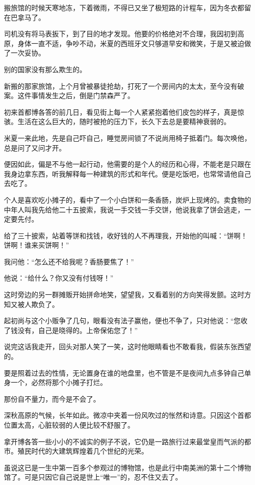 \par 搬旅馆的时候天寒地冻，下着微雨，不得已又坐了极短路的计程车，因为冬衣都留在巴拿马了。
\par 司机没有将马表扳下，到了目的地才发现。他要的价格绝对不合理，我因初到高原，身体一直不适，争吵不动，米夏的西班牙文只够道早安和微笑，于是又被迫做了一次妥协。
\par 别的国家没有那么欺生的。
\par 新搬的那家旅馆，上个月曾被暴徒抢劫，打死了一个房间内的太太，至今没有破案。这件事情发生之后，倒是门禁森严了。
\par 初来首都博各答的前几日，看见街上每一个人紧紧抱着他们皮包的样子，真是惊骇。生活在这么巨大的，随时被抢的压力下，长久下去总是要精神衰弱的。
\par 米夏一来此地，先是自己吓自己，睡觉房间锁了不说尚用椅子抵着门。每次唤他，总是问了又问才开。
\par 便因如此，偏是不与他一起行动，他需要的是个人的经历和心得，不能老是只跟在我身边拿东西，听我解释每一种建筑的形式和年代。便是吃饭吧，也常常请他自己去吃了。
\par 个人是喜欢吃小摊子的，看中了一个小白饼和一条香肠，炭炉上现烤的。卖食物的中年人叫我先给他二十五披索，我说一手交钱一手交饼，他说我拿了饼会逃走，一定要先付。
\par 给了三十披索，站着等饼和找钱，收好钱的人不再理我，开始他的叫喊：“饼啊！饼啊！谁来买饼啊！”
\par 我问他：“怎么还不给我呢？香肠要焦了！”
\par 他说：“给什么？你又没有付钱呀！”
\par 这时旁边的另一群摊贩开始拼命地笑，望望我，又看着别的方向笑得发颤。这时方知又被人欺负了。
\par 起初尚与这个小贩争了几句，眼看没有法子赢他，便也不争了，只对他说：“您收了钱没有，自己是晓得的。上帝保佑您了！”
\par 说完这话我走开，回头对那人笑了一笑，这时他眼睛看也不敢看我，假装东张西望的。
\par 要是照着过去的性情，无论置身在谁的地盘里，也不管是不是夜间九点多钟自己单身一个，必然将那个小摊子打烂。
\par 那份自不量力，而今是不会了。
\par 深秋高原的气候，长年如此。微凉中夹着一份风吹过的怅然和诗意。只因这个首都位置太高，心脏较弱的人便比较不舒服了。
\par 拿开博各答一些小小的不诚实的例子不说，它仍是一路旅行过来最堂皇而气派的都市。殖民时代的大建筑辉煌着几个世纪的光荣。
\par 虽说这已是一生中第一百多个参观过的博物馆，也是此行中南美洲的第十二个博物馆了。可是只因它自己说是世上“唯一”的，忍不住又去了。
